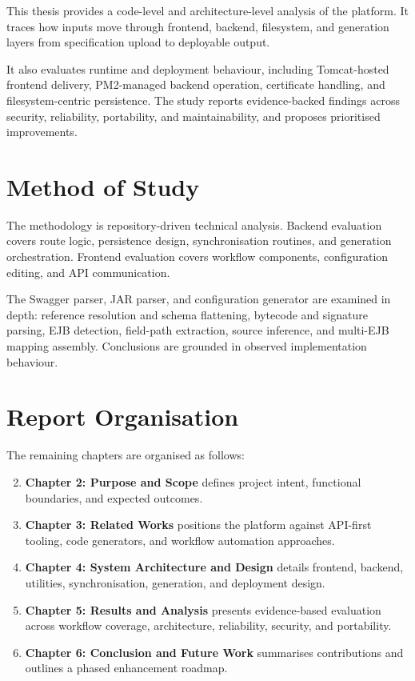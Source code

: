 This thesis provides a code-level and architecture-level analysis of the platform. It traces how inputs move through frontend, backend, filesystem, and generation layers from specification upload to deployable output.

It also evaluates runtime and deployment behaviour, including Tomcat-hosted frontend delivery, PM2-managed backend operation, certificate handling, and filesystem-centric persistence. The study reports evidence-backed findings across security, reliability, portability, and maintainability, and proposes prioritised improvements.

\section{Method of Study}

The methodology is repository-driven technical analysis. Backend evaluation covers route logic, persistence design, synchronisation routines, and generation orchestration. Frontend evaluation covers workflow components, configuration editing, and API communication.

The Swagger parser, JAR parser, and configuration generator are examined in depth: reference resolution and schema flattening, bytecode and signature parsing, EJB detection, field-path extraction, source inference, and multi-EJB mapping assembly. Conclusions are grounded in observed implementation behaviour.

\section{Report Organisation}

The remaining chapters are organised as follows:

\begin{enumerate}
    \setcounter{enumi}{1}
    \item \textbf{Chapter 2: Purpose and Scope} defines project intent, functional boundaries, and expected outcomes.
    \item \textbf{Chapter 3: Related Works} positions the platform against API-first tooling, code generators, and workflow automation approaches.
    \item \textbf{Chapter 4: System Architecture and Design} details frontend, backend, utilities, synchronisation, generation, and deployment design.
    \item \textbf{Chapter 5: Results and Analysis} presents evidence-based evaluation across workflow coverage, architecture, reliability, security, and portability.
    \item \textbf{Chapter 6: Conclusion and Future Work} summarises contributions and outlines a phased enhancement roadmap.
\end{enumerate}
